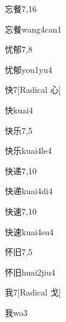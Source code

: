\begin{entry}{忘餐}{7,16}
  \begin{phonetics}{忘餐}{wang4can1}
  \end{phonetics}
\end{entry}

\begin{entry}{忧郁}{7,8}
  \begin{phonetics}{忧郁}{you1yu4}
  \end{phonetics}
\end{entry}

\begin{entry}{快}{7}[Radical 心]
  \begin{phonetics}{快}{kuai4}
  \end{phonetics}
\end{entry}

\begin{entry}{快乐}{7,5}
  \begin{phonetics}{快乐}{kuai4le4}
  \end{phonetics}
\end{entry}

\begin{entry}{快递}{7,10}
  \begin{phonetics}{快递}{kuai4di4}
  \end{phonetics}
\end{entry}

\begin{entry}{快速}{7,10}
  \begin{phonetics}{快速}{kuai4su4}
  \end{phonetics}
\end{entry}

\begin{entry}{怀旧}{7,5}
  \begin{phonetics}{怀旧}{huai2jiu4}
  \end{phonetics}
\end{entry}

\begin{entry}{我}{7}[Radical 戈]
  \begin{phonetics}{我}{wo3}
  \end{phonetics}
\end{entry}

